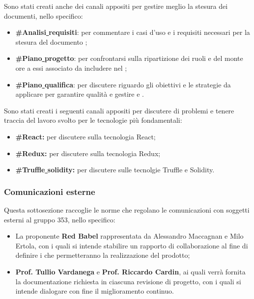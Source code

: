 \documentclass[NormeDiProgetto.tex]{subfiles}
\begin{document}
	Sono stati creati anche dei canali appositi per gestire meglio la stesura dei documenti, nello specifico:
	\begin{itemize}
		\item \textbf{\#Analisi\underline{ }requisiti}: per commentare i casi d'uso e i requisiti necessari per la stesura del documento \adr;
		\item \textbf{\#Piano\underline{ }progetto}: per confrontarsi sulla ripartizione dei ruoli e del monte ore a essi associato da includere nel \pdp;
		\item \textbf{\#Piano\underline{ }qualifica}: per discutere riguardo gli obiettivi e le strategie da applicare per garantire qualità e gestire  e .
	\end{itemize}
	
	Sono stati creati i seguenti canali appositi per discutere di problemi e tenere traccia del lavoro svolto per le tecnologie più fondamentali:
	\begin{itemize}
		\item \textbf{\#React:} per discutere sulla tecnologia React;
		\item \textbf{\#Redux:} per discutere sulla tecnologia Redux;
		\item \textbf{\#Truffle\underline{ }solidity:} per discutere sulle tecnolgie Truffle e Solidity.
	\end{itemize}

	\subsubsection{Comunicazioni esterne}
	Questa sottosezione raccoglie le norme che regolano le comunicazioni con soggetti esterni al gruppo 353, nello specifico:
	\begin{itemize}
		\item La proponente \textbf{Red Babel} rappresentata da Alessandro Maccagnan e Milo Ertola, con i quali si intende stabilire un rapporto di collaborazione al fine di definire i  che permetteranno la realizzazione del prodotto;
		\item \textbf{Prof. Tullio Vardanega} e \textbf{Prof. Riccardo Cardin}, ai quali verrà fornita la documentazione richiesta in ciascuna revisione di progetto, con i quali si intende dialogare con fine il miglioramento continuo.
	\end{itemize}
\end{document}
